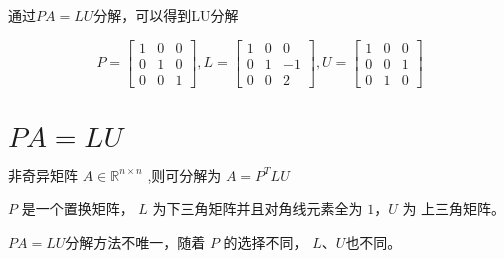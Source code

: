 \begin{example}
    通过$PA=LU$分解，可以得到LU分解

    \begin{equation}P=\left[\begin{matrix}
        1 & 0 & 0\\
        0 & 1 & 0\\
        0 & 0 & 1
        \end{matrix}\right] ,L=\left[\begin{matrix}
        1 & 0 & 0\\
        0 & 1 & -1\\
        0 & 0 & 2
        \end{matrix}\right] ,U=\left[\begin{matrix}
        1 & 0 & 0\\
        0 & 0 & 1\\
        0 & 1 & 0
        \end{matrix}\right]\end{equation}
\end{example}

\section{\texorpdfstring{$PA=LU$}{PA=LU}}

\begin{theorem}
    非奇异矩阵 $ {A} \in \mathbb{R}^{n \times n} $ ,则可分解为 $ A=P^{T} L U $

    $ P $ 是一个置换矩阵， $ L $ 为下三角矩阵并且对角线元素全为 $ 1 ， U $ 为 上三角矩阵。
\end{theorem}


$PA=LU$分解方法不唯一，随着 $ P $ 的选择不同， $L$、$U$也不同。

